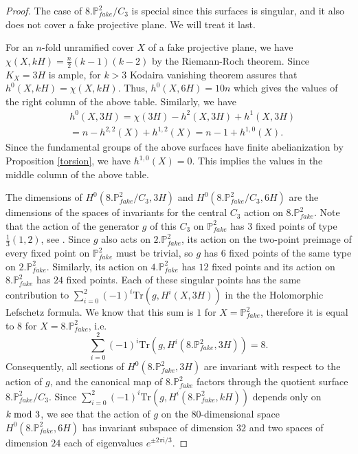 \documentclass[11pt,reqno]{amsart}
\def\ii {{\mathrm i}}
\def\P {{\mathbb P}}
\def\FPP {{\P^2_{fake}}}
\theoremstyle{definition}
\numberwithin{equation}{section}
\begin{document}
\begin{proof}
The case of $8.\FPP/C_3$ is special since this surfaces is singular, and it also does not cover a fake projective plane. We will treat it last.

\medskip
For an $n$-fold unramified cover $X$ of a fake projective plane, we have $\chi(X, kH) = \frac n2(k-1)(k-2)$ by the Riemann-Roch theorem. Since $K_X=3H$ is ample, for $k>3$ Kodaira vanishing theorem assures that $h^0(X,kH)=\chi(X, kH)$. Thus, $h^0(X,6H)=10 n$ which gives the values of the right column of the above table. Similarly, we have 
\begin{align*}
&h^0(X,3H) = \chi(3H) - h^2(X,3H) + h^1(X,3H) \\
&=  n - h^{2,2}(X) + h^{1,2}(X) = n - 1 + h^{1,0}(X).
\end{align*}
Since the fundamental groups of the above surfaces have finite abelianization by Proposition \ref{torsion}, we have $h^{1,0}(X) = 0$. This implies the values in the middle  column of the above table.

\medskip
The dimensions of $H^0(8.\FPP/C_3 ,3H)$ and $H^0(8.\FPP/C_3 ,6H)$ are the dimensions of the spaces of invariants for the central $C_3$ action on $8.\FPP$. Note that the action of the generator $g$ of this $C_3$ on $\FPP$ has $3$ fixed points of type $\frac 13(1, 2)$, see \cite{KeumQ}. 
Since $g$ also acts on $2.\FPP$, its action on the two-point preimage of every fixed point on $\FPP$ must be trivial, so $g$ has $6$ fixed points of the same type on $2.\FPP$. Similarly, its action on $4.\FPP$ has $12$ fixed points and its action on $8.\FPP$ has $24$ fixed points. Each of these singular points has the same contribution to $\sum_{i=0}^2(-1)^i {\mathrm {Tr}}(g, H^i(X, 3H))$ in the the Holomorphic Lefschetz formula. We know that this sum is $1$ for $X=\FPP$, therefore it is equal to $8$ for $X=8.\FPP$, i.e.
$$
\displaystyle\sum_{i=0}^2(-1)^i {\mathrm {Tr}}(g, H^i(8.\FPP, 3H)) = 8.
$$
Consequently, all sections of $H^0(8.\FPP,3H)$ are invariant with respect to the action of $g$, and the canonical map of $8.\FPP$ factors through the quotient  surface $8.\FPP/C_3$. Since $\sum_{i=0}^2(-1)^i {\mathrm {Tr}}(g, H^i(8.\FPP, kH))$ 
depends only on $k\hskip -4pt\mod 3$, we see that the action of $g$ on the $80$-dimensional space $H^0(8.\FPP,6H)$ has invariant subspace of dimension $32$ and two spaces of dimension $24$ each of eigenvalues $e^{\pm 2\pi \ii/3}$.
\end{proof}
\end{document}
